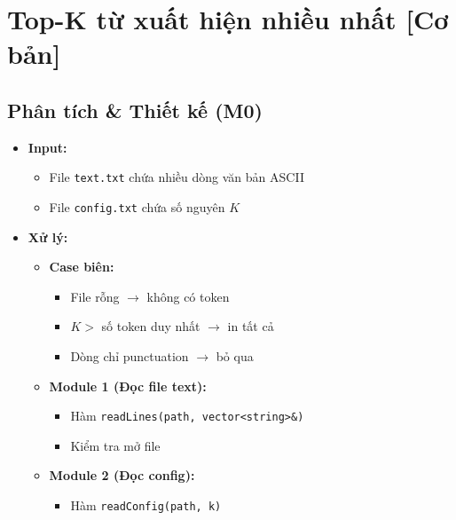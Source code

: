\section{Top-K từ xuất hiện nhiều nhất [Cơ bản]}
\subsection{Phân tích \& Thiết kế (M0)}

\begin{itemize}

    \item \textbf{Input:}

    \begin{itemize}
        \item File \texttt{text.txt} chứa nhiều dòng văn bản ASCII
        \item File \texttt{config.txt} chứa số nguyên $K$
    \end{itemize}

    \item \textbf{Xử lý:}

    \begin{itemize}

        \item \textbf{Case biên:}

        \begin{itemize}
            \item File rỗng $\rightarrow$ không có token
            \item $K >$ số token duy nhất $\rightarrow$ in tất cả
            \item Dòng chỉ punctuation $\rightarrow$ bỏ qua
        \end{itemize}

        \item \textbf{Module 1 (Đọc file text):}

        \begin{itemize}
            \item Hàm \texttt{readLines(path, vector<string>\&)}
            \item Kiểm tra mở file
        \end{itemize}

        \item \textbf{Module 2 (Đọc config):}

        \begin{itemize}
            \item Hàm \texttt{readConfig(path, k)}
        \end{itemize}


\end{itemize}
\end{itemize}

